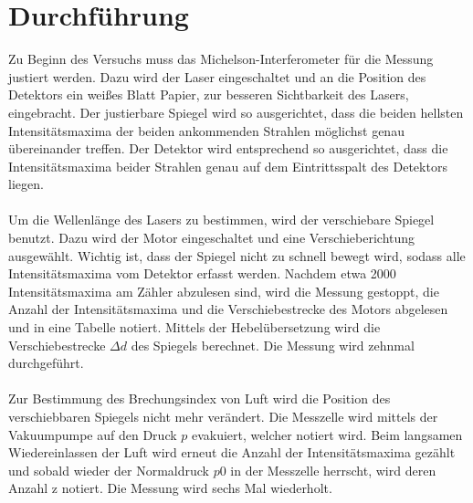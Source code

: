 \section{Durchführung}
\label{Durchführung}
Zu Beginn des Versuchs muss das Michelson-Interferometer für die Messung justiert werden. 
Dazu wird der Laser eingeschaltet und an die Position des Detektors ein weißes Blatt Papier, zur besseren Sichtbarkeit des Lasers, eingebracht.
Der justierbare Spiegel wird so ausgerichtet, dass die beiden hellsten Intensitätsmaxima
der beiden ankommenden Strahlen möglichst genau übereinander treffen. 
Der Detektor wird entsprechend so ausgerichtet, dass die Intensitätsmaxima beider
Strahlen genau auf dem Eintrittsspalt des Detektors liegen.\\
\\
Um die Wellenlänge des Lasers zu bestimmen, wird der verschiebare Spiegel benutzt. Dazu wird der Motor eingeschaltet und eine Verschieberichtung
ausgewählt.
Wichtig ist, dass der Spiegel nicht zu schnell bewegt wird, sodass alle Intensitätsmaxima vom Detektor erfasst werden.
Nachdem etwa 2000 Intensitätsmaxima am Zähler abzulesen sind, wird die Messung gestoppt, die Anzahl der Intensitätsmaxima und die Verschiebestrecke 
des Motors abgelesen und in eine Tabelle notiert.
Mittels der Hebelübersetzung wird die Verschiebestrecke $\Delta d$ des Spiegels berechnet.
Die Messung wird zehnmal durchgeführt.\\
\\

Zur Bestimmung des Brechungsindex von Luft wird die Position des verschiebbaren Spiegels nicht
mehr verändert.
Die Messzelle wird mittels der Vakuumpumpe auf den Druck $p$ evakuiert, welcher notiert
wird. Beim langsamen Wiedereinlassen der Luft wird erneut die Anzahl der Intensitätsmaxima gezählt
und sobald wieder der Normaldruck $p0$ in der Messzelle herrscht, wird deren Anzahl z notiert.
Die Messung wird sechs Mal wiederholt.
